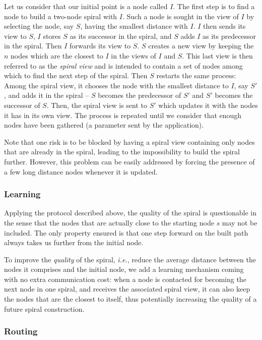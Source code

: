Let us consider that our initial point is a node called $I$. The first step is
to find a node to build a two-node spiral with $I$. Such a node is sought in the
view of $I$ by selecting the node, say $S$, having the smallest distance with
$I$. $I$ then sends its view to $S$, $I$ stores $S$ as its successor in the
spiral, and $S$ adds $I$ as its predecessor in the spiral. Then $I$ forwards its
view to $S$. $S$ creates a new view by keeping the $n$ nodes which are the
closest to $I$ in the views of $I$ and $S$. This last view is then referred to
as the \emph{spiral view} and is intended to contain a set of nodes among which
to find the next step of the spiral. Then $S$ restarts the same process: Among
the spiral view, it chooses the node with the smallest distance to $I$, say
$S'$, and adds it in the spiral -- $S$ becomes the predecessor of $S'$ and $S'$
becomes the successor of $S$. Then, the spiral view is sent to $S'$ which
updates it with the nodes it has in its own view. The process is repeated until
we consider that enough nodes have been gathered (a parameter sent by the
application).

Note that one risk is to be blocked by having a spiral view containing only
nodes that are already in the spiral, leading to the impossibility to build the
spiral further. However, this problem can be easily addressed by forcing the
presence of a few long distance nodes whenever it is updated.

\subsubsection*{Learning}

Applying the protocol described above, the quality of the spiral is
questionable in the sense that the nodes that are actually close to the starting
node $s$ may not be included. The only property ensured is that one step
forward on the built path always takes us further from the initial node.

To improve the \emph{quality} of the spiral, \emph{i.e.}, reduce the average
distance between the nodes it comprises and the initial node, we add a learning
mechanism coming with no extra communication cost: when a node is contacted for
becoming the next node in one spiral, and receives the associated spiral view,
it can also keep the nodes that are the closest to itself, thus potentially
increasing the quality of a future spiral construction.

\subsubsection*{Routing}

